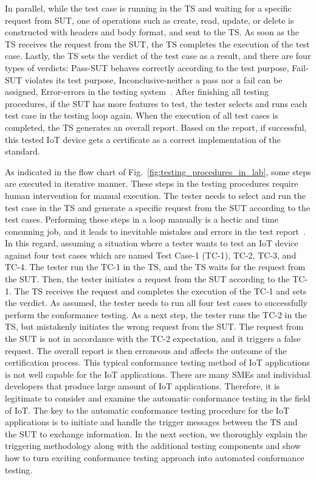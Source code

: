 In parallel, while the test case is running in the TS and waiting for a specific request from SUT, one of operations such as create, read, update, or delete is constructed with headers and body format, and sent to the TS. As soon as the TS receives the request from the SUT, the TS completes the execution of the test case. Lastly, the TS sets the verdict of the test case as a result, and there are four types of verdicts: Pass-SUT behaves correctly according to the test purpose, Fail-SUT violates its test purpose, Inconclusive-neither a pass nor a fail can be assigned, Error-errors in the testing system~\cite{muhammad2008introduction}. After finishing all testing procedures, if the SUT has more features to test, the tester selects and runs each test case in the testing loop again. When the execution of all test cases is completed, the TS generates an overall report. Based on the report, if successful, this tested IoT device gets a certificate as a correct implementation of the standard.

As indicated in the flow chart of Fig.~\ref{fig:testing_procedures_in_lab}, some steps are executed in iterative manner. These steps in the testing procedures require human intervention for manual execution. The tester needs to select and run the test case in the TS and generate a specific request from the SUT according to the test cases. Performing these steps in a loop manually is a hectic and time consuming job, and it leads to inevitable mistakes and errors in the test report~\cite{gonccalves2017influence}. In this regard, assuming a situation where a tester wants to test an IoT device against four test cases which are named Test Case-1 (TC-1), TC-2, TC-3, and TC-4. The tester run the TC-1 in the TS, and the TS waits for the request from the SUT. Then, the tester initiates a request from the SUT according to the TC-1. The TS receives the request and completes the execution of the TC-1 and sets the verdict. As assumed, the tester needs to run all four test cases to successfully perform the conformance testing. As a next step, the tester runs the TC-2 in the TS, but mistakenly initiates the wrong request from the SUT. The request from the SUT is not in accordance with the TC-2 expectation, and it triggers a false request. The overall report is then erroneous and affects the outcome of the certification process. This typical conformance testing method of IoT applications is not well capable for the IoT applications. There are many SMEs and individual developers that produce large amount of IoT applications. Therefore, it is legitimate to consider and examine the automatic conformance testing in the field of IoT. The key to the automatic conformance testing procedure for the IoT applications is to initiate and handle the trigger messages between the TS and the SUT to exchange information. In the next section, we thoroughly explain the triggering methodology along with the additional testing components and show how to turn exciting conformance testing approach into automated conformance testing.



